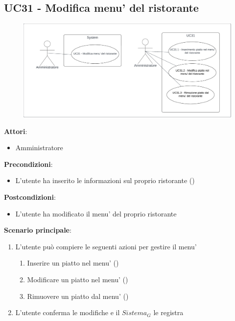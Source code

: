 \subsection{UC31 - Modifica menu' del ristorante}\label{usecase:31}
\begin{figure}[H]
    \centering
    \includegraphics[width=0.9\linewidth]{ucd/UCD31.png}
\end{figure}
\textbf{Attori}:
\begin{itemize}
    \item Amministratore
\end{itemize}
\textbf{Precondizioni}:
\begin{itemize}
    \item L'utente ha inserito le informazioni sul proprio ristorante ()
\end{itemize}
\textbf{Postcondizioni}:
\begin{itemize}
    \item L'utente ha modificato il menu' del proprio ristorante
\end{itemize}
\textbf{Scenario principale}:
\begin{enumerate}
    \item L'utente può compiere le seguenti azioni per gestire il menu'
    \begin{enumerate}
        \item Inserire un piatto nel menu' ()
        \item Modificare un piatto nel menu' ()
        \item Rimuovere un piatto dal menu' ()
    \end{enumerate}
    \item L'utente conferma le modifiche e il $\textit{Sistema}_G$ le registra
\end{enumerate}